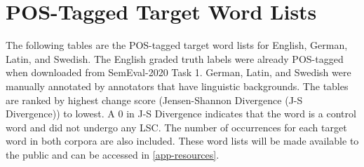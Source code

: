 \section{POS-Tagged Target Word Lists}
\label{app-postags}


The following tables are the POS-tagged target word lists for English, German, Latin, and Swedish. The English graded truth labels were already POS-tagged when downloaded from SemEval-2020 Task 1. German, Latin, and Swedish were manually annotated by annotators that have linguistic backgrounds. The tables are ranked by highest change score (Jensen-Shannon Divergence (J-S Divergence)) to lowest. A 0 in J-S Divergence indicates that the word is a control word and did not undergo any LSC. The number of occurrences for each target word in both corpora are also included. These word lists will be made available to the public and can be accessed in \autoref{app-resources}.



